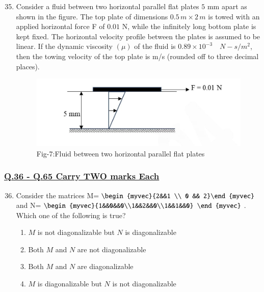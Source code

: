 \documentclass[journal]{IEEEtran}
\theoremstyle{remark}
\begin{document}
\begin{enumerate}[itemsep=1em]
\setcounter{enumi}{34}
\item Consider a fluid between two horizontal parallel flat plates $5$ mm apart as shown in the figure. The top plate of dimensions $0.5\,m \times 2\,m$ is towed with an applied horizontal force F of $0.01$ N, while the infinitely long bottom plate is kept fixed. The horizontal velocity profile between the plates is assumed to be linear. If the 
dynamic viscosity $(\mu)$ of the fluid is $0.89 \times 10^{-3} \quad N-s/m^2$, then the towing velocity of 
the top plate is \underline{\hspace{2cm}} m/s (rounded off to three decimal places).
\begin{figure}[H]
    \centering
    \includegraphics[width=0.5\columnwidth]{figs/fig-7.jpeg}
    \caption*{Fig-7:Fluid between two horizontal parallel flat plates}
    \label{fig-7}
\end{figure}


\end{enumerate}

\newpage
\vspace*{0.25cm}
\subsubsection{\underline{Q.36 - Q.65 Carry TWO marks Each}}

\begin{enumerate}[itemsep=1em]
\setcounter{enumi}{35}
    \item Consider the matrices M=$\begin{myvec}{2&&1 \\ 0 && 2}\end{myvec}$ and N=$\begin{myvec}{1&&0&&0\\1&&2&&0\\1&&1&&0} \end{myvec}$. Which one of the following is true?

\begin{enumerate}[leftmargin=2.5em, labelsep=0.5em, itemsep=0.5em]
       \item $M$ is not diagonalizable but $N$ is diagonalizable 
       \item Both $M$ and $N$ are not diagonalizable
       \item Both $M$ and $N$ are diagonalizable   
       \item $M$ is diagonalizable but $N$ is not diagonalizable 
\end{enumerate}


\end{enumerate}
\end{document}
